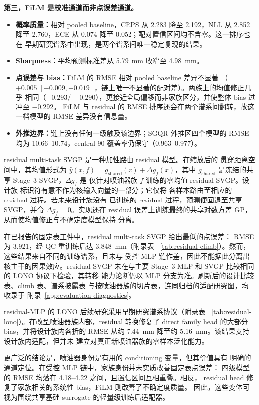 \textbf{第三，FiLM 是校准通道而非点误差通道。}
\begin{itemize}
  \item \textbf{概率质量：}相对 pooled baseline，CRPS 从 2.283 降至 2.192，NLL 从
  2.852 降至 2.760，ECE 从 0.074 降至 0.052；配对置信区间均不含零。这一排序也在
  早期研究谱系中出现，是两个谱系间唯一稳定复现的结果。
  \item \textbf{Sharpness：}平均预测标准差从 \SI{5.79}{mm} 收窄至 \SI{4.98}{mm}。
  \item \textbf{点误差与 bias：}FiLM 的 RMSE 相对 pooled baseline 差异不显著
  （\(+0.005\;[-0.009,+0.019]\)，链上唯一不显著的配对差）。两族上的均值修正几乎
  相同（\(-0.293/-0.290\)），更接近全局偏移而非家族区分，并使整体 bias 过冲至 \(-0.292\)。
  FiLM 与 residual 的 RMSE 排序还会在两个谱系间翻转，故这一档模型的 RMSE 差异没有信息量。
  \item \textbf{外推边界：}链上没有任何一级触及该边界；SGQR 外推区四个模型的 RMSE 均为
  10.66--10.74，central-90 覆盖率仍保守（0.963--0.977）。
\end{itemize}

residual multi-task SVGP 是一种加性路由 residual 模型。在缩放后的
贯穿距离空间中，其均值形式为
\(\hat{y}(x,f)=g_{\mathrm{shared}}(x)+\Delta g_f(x)\)，其中
\(g_{\mathrm{shared}}\) 是冻结的共享 Stage~3 SVGP，\(\Delta g_f\) 是
仅针对喷油器族 \(f\) 训练的零均值 residual SVGP。设计族
标识符有意不作为核输入向量的一部分；它仅将
各样本路由至相应的 residual 过程。若未来设计族没有
已训练的 residual 过程，预测便回退至共享 SVGP，并令
\(\Delta g_f=0\)。实现还在 residual 误差上训练最终的共享对数方差 GP，
从而使均值修正与不确定度模型保持
分离。

在已报告的固定表工件中，residual multi-task SVGP 给出最低的点误差：
RMSE 为 3.921，经 QC 重训练后达 \SI{3.848}{mm}（附录表
~\ref{tab:residual-climb}）。然而，这些结果来自不同的训练谱系，且未与
受控 MLP 链作差，因此不能据此分离出核主干的因果效应。residual-SVGP
未在与主要 Stage~3 MLP 和 SVGP 比较相同的 LONO 协议下检验，其转移
能力论断仍以 MLP 分支为准。刷新后的设计比较表、climb 表、谱系披露表
与按喷油器族的切片表，连同归档的适配研究图，均收录于
附录~\ref{app:evaluation-diagnostics}。

residual-MLP 的 LONO 后续研究采用早期研究谱系协议（附录表
~\ref{tab:residual-lono}）。在改型喷油器族内部，residual 转换修复了
direct family head 的大部分 bias，并将设计族内各折的 RMSE 从约
\SI{7.44}{mm} 降至约 \SI{5.16}{mm}。该结果支持设计族内适配，但并未
建立对真正新喷油器族的零样本泛化能力。

更广泛的结论是，喷油器身份是有用的 conditioning 变量，但其价值具有
明确的通道定位。在受控 MLP 链中，家族身份并未实质改善固定表点误差：
四级模型的 RMSE 均落在 4.18--4.22 之间，且置信区间互相重叠。相反，
residual head 修复了家族相关的系统性 bias，FiLM 则改善了不确定度质量。
因此，这些变体可视为围绕共享基础 surrogate 的轻量级训练后适配器。

